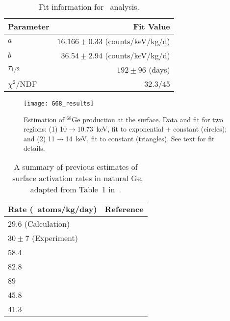        			\begin{table}
				\centering
				\begin{tabular}{l r}
					\toprule
					Parameter & Fit Value \\
					\midrule
					$a$ & $16.166\pm0.33$ (counts/keV/kg/d)  \\
					$b$ & $36.54\pm2.94$ (counts/keV/kg/d)  \\
					$\tau_{1/2}$ & $192\pm96$ (days) \\
					$\chi^{2}$/NDF & 32.3/45 \\					
					\bottomrule
				\end{tabular}
				\caption[Fit information for \gersixeight~analysis]
				{Fit information for \gersixeight~analysis.}
				\label{tab:Ge68FitResults}	
			\end{table}	
			
			\begin{figure}
				\centering
				\texttt{[image: G68\_results]}
				\caption[Estimation of $^{68}$Ge production at the surface]
				{Estimation of $^{68}$Ge production at the surface.  Data and fit for two regions:
				(1) 10$\to$10.73~keV, fit to exponential + constant (circles); and (2) 11$\to$14~keV, 
				fit to constant (triangles).  See text for fit details.}
				\label{fig:GE68Production}
			\end{figure}			
			
	          
	          	\begin{table}
				\centering
				\begin{tabular}{l r}
					\toprule
					Rate (\gersixeight~atoms/kg/day) & Reference \\
					\midrule
					29.6 (Calculation) & \cite{Avi92}\\
					$30\pm7$ (Experiment) & \cite{Avi92}\\
					58.4 & \cite{KlapdorKleingrothaus2002149}\\
					82.8 & \cite{Barabanov2006115}\\
					89 & \cite{Ceb06aa} \\
					45.8 & \cite{Back2008286}\\
					41.3 & \cite{Mei2009417}\\
					\bottomrule
				\end{tabular}
				\caption[Summary of previous estimates of \gersixeight~surface activation rates in natural Ge.]
				{A summary of previous estimates of \gersixeight~surface activation rates in natural Ge, 
				adapted from Table~1 in~\cite{Elliott:2009cw}.}
				\label{tab:Ge68PreviousResults}
	          	\end{table}			
			
